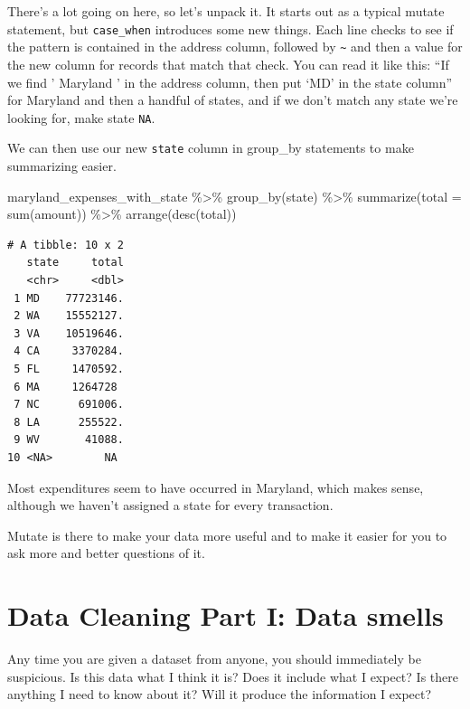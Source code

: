 \documentclass[
  letterpaper,
  DIV=11,
  numbers=noendperiod]{scrreprt}
\newenvironment{Shaded}{\begin{snugshade}}{\end{snugshade}}
\newcommand{\AttributeTok}[1]{\textcolor[rgb]{0.40,0.45,0.13}{#1}}
\newcommand{\FunctionTok}[1]{\textcolor[rgb]{0.28,0.35,0.67}{#1}}
\newcommand{\NormalTok}[1]{\textcolor[rgb]{0.00,0.23,0.31}{#1}}
\newcommand{\SpecialCharTok}[1]{\textcolor[rgb]{0.37,0.37,0.37}{#1}}
\begin{document}
There's a lot going on here, so let's unpack it. It starts out as a
typical mutate statement, but \texttt{case\_when} introduces some new
things. Each line checks to see if the pattern is contained in the
address column, followed by \texttt{\textasciitilde{}} and then a value
for the new column for records that match that check. You can read it
like this: ``If we find ' Maryland ' in the address column, then put
`MD' in the state column'' for Maryland and then a handful of states,
and if we don't match any state we're looking for, make state
\texttt{NA}.

We can then use our new \texttt{state} column in group\_by statements to
make summarizing easier.

\begin{Shaded}
\begin{Highlighting}[]
\NormalTok{maryland\_expenses\_with\_state }\SpecialCharTok{\%\textgreater{}\%}
  \FunctionTok{group\_by}\NormalTok{(state) }\SpecialCharTok{\%\textgreater{}\%}
  \FunctionTok{summarize}\NormalTok{(}\AttributeTok{total =} \FunctionTok{sum}\NormalTok{(amount)) }\SpecialCharTok{\%\textgreater{}\%}
  \FunctionTok{arrange}\NormalTok{(}\FunctionTok{desc}\NormalTok{(total))}
\end{Highlighting}
\end{Shaded}

\begin{verbatim}
# A tibble: 10 x 2
   state     total
   <chr>     <dbl>
 1 MD    77723146.
 2 WA    15552127.
 3 VA    10519646.
 4 CA     3370284.
 5 FL     1470592.
 6 MA     1264728 
 7 NC      691006.
 8 LA      255522.
 9 WV       41088.
10 <NA>        NA 
\end{verbatim}

Most expenditures seem to have occurred in Maryland, which makes sense,
although we haven't assigned a state for every transaction.

Mutate is there to make your data more useful and to make it easier for
you to ask more and better questions of it.


\hypertarget{data-cleaning-part-i-data-smells}{%
\chapter{Data Cleaning Part I: Data
smells}\label{data-cleaning-part-i-data-smells}}

Any time you are given a dataset from anyone, you should immediately be
suspicious. Is this data what I think it is? Does it include what I
expect? Is there anything I need to know about it? Will it produce the
information I expect?
\end{document}
